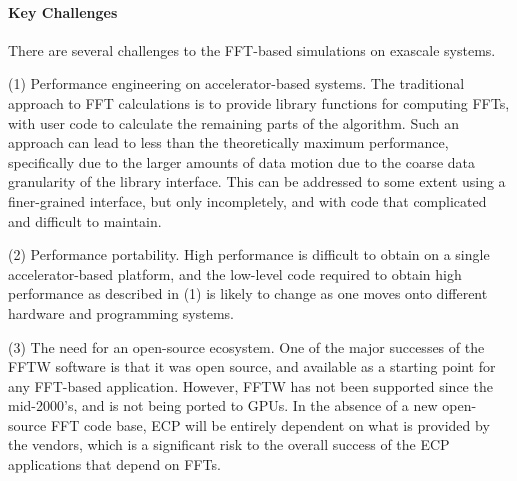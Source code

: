 \paragraph{Key Challenges}
There are several challenges to the FFT-based simulations on exascale systems. 
\begin{trivlist}
\item
(1) Performance engineering on accelerator-based systems. The traditional approach to FFT calculations is to provide library functions for computing FFTs, with user code to calculate the remaining parts of the algorithm. Such an approach can lead to less than the theoretically maximum performance, specifically due to the larger amounts of data motion due to the coarse data granularity of the library interface. This can be addressed to some extent using a finer-grained interface, but only incompletely, and with code that complicated and difficult to maintain.
\item
(2) Performance portability. High performance is difficult to obtain on a single accelerator-based platform, and the low-level code required to obtain high performance as described in (1) is likely to change as one moves onto different hardware and programming systems. 

\item
(3)
The need for an open-source ecosystem. One of the major successes of the FFTW software is that it was open source, and available as a starting point for any FFT-based application. However, FFTW has not been supported since the mid-2000's, and is not being ported to GPUs. In the absence of a new open-source FFT code base, ECP will be entirely dependent on what is provided by the vendors, which is a significant risk to the overall success of the ECP applications that depend on FFTs. 
\end{trivlist}

